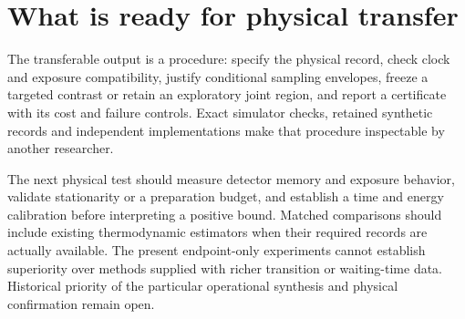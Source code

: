 \section{What is ready for physical transfer}
The transferable output is a procedure: specify the physical record, check
clock and exposure compatibility, justify conditional sampling envelopes,
freeze a targeted contrast or retain an exploratory joint region, and report
a certificate with its cost and failure controls. Exact simulator checks,
retained synthetic records and independent implementations make that procedure
inspectable by another researcher.

The next physical test should measure detector memory and exposure behavior,
validate stationarity or a preparation budget, and establish a time and energy
calibration before interpreting a positive bound. Matched comparisons should
include existing thermodynamic estimators when their required records are
actually available. The present endpoint-only experiments cannot establish
superiority over methods supplied with richer transition or waiting-time data.
Historical priority of the particular operational synthesis and physical
confirmation remain open.
